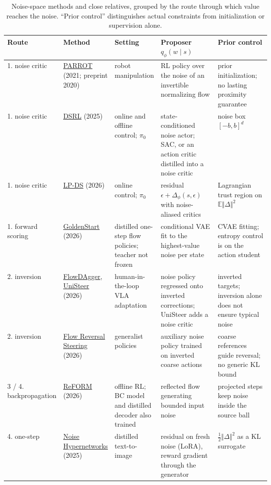 \begin{table}[htbp]
\centering\footnotesize
\caption{Noise-space methods and close relatives, grouped by the route through which value reaches the noise. ``Prior control'' distinguishes actual constraints from initialization or supervision alone.}
\label{tab:map}
\begin{tabularx}{\linewidth}{@{}>{\raggedright}p{0.12\linewidth}>{\raggedright}p{0.14\linewidth}>{\raggedright}p{0.17\linewidth}>{\raggedright}X>{\raggedright\arraybackslash}p{0.2\linewidth}@{}}
\toprule
Route & Method & Setting & Proposer $q_\phi(w \mid s)$ & Prior control \\
\midrule
1. noise critic & \hyperlink{ref:3}{PARROT} (2021; preprint 2020) & robot manipulation & RL policy over the noise of an invertible normalizing flow & prior initialization; no lasting proximity guarantee \\
1. noise critic & \hyperlink{ref:2}{DSRL} (2025) & online and offline control; $\pi_0$ & state-conditioned noise actor; SAC, or an action critic distilled into a noise critic & noise box $[-b, b]^d$ \\
1. noise critic & \hyperlink{ref:11}{LP-DS} (2026) & online control; $\pi_0$ & residual $\epsilon + \Delta_\phi(s, \epsilon)$ with noise-aliased critics & Lagrangian trust region on $\mathbb{E}\Vert\Delta\Vert^2$ \\
1. forward scoring & \hyperlink{ref:10}{GoldenStart} (2026) & distilled one-step flow policies; teacher not frozen & conditional VAE fit to the highest-value noise per state & CVAE fitting; entropy control is on the action student \\
2. inversion & \hyperlink{ref:14}{FlowDAgger}, \hyperlink{ref:15}{UniSteer} (2026) & human-in-the-loop VLA adaptation & noise policy regressed onto inverted corrections; UniSteer adds a noise critic & inverted targets; inversion alone does not ensure typical noise \\
2. inversion & \hyperlink{ref:16}{Flow Reversal Steering} (2026) & generalist policies & auxiliary noise policy trained on inverted coarse actions & coarse references guide reversal; no generic KL bound \\
3 / 4. backpropagation & \hyperlink{ref:13}{ReFORM} (2026) & offline RL; BC model and distilled decoder also trained & reflected flow generating bounded input noise & projected steps keep noise inside the source ball \\
4. one-step & \hyperlink{ref:6}{Noise Hypernetworks} (2025) & distilled text-to-image & residual on fresh noise (LoRA), reward gradient through the generator & $\tfrac12\Vert\Delta\Vert^2$ as a KL surrogate \\

\end{tabularx}
\end{table}
